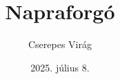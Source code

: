 \documentclass{article}
\begin{document}
\title{Napraforgó}
\author{Cserepes Virág}
\date{2025. július 8.}
\maketitle
\hulipsum
\end{document}
